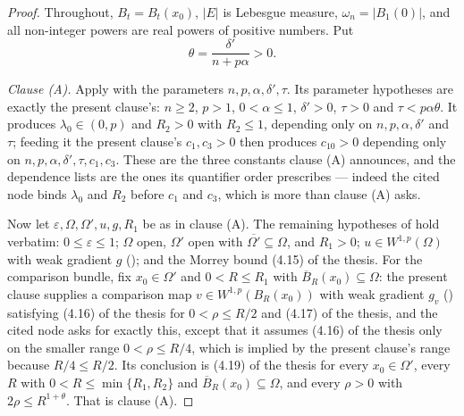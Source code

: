 \begin{proof}
Throughout, $B_t=B_t(x_0)$, $|E|$ is Lebesgue measure, $\omega_n=|B_1(0)|$, and
all non-integer powers are real powers of positive numbers.  Put
\[
\theta=\frac{\delta'}{n+p\alpha}>0 .
\]

\emph{Clause (A).}  Apply  with the parameters
$n,p,\alpha,\delta',\tau$.  Its parameter hypotheses are exactly the present
clause's: $n\ge2$, $p>1$, $0<\alpha\le1$, $\delta'>0$, $\tau>0$ and
$\tau<p\alpha\theta$.  It produces $\lambda_0\in(0,p)$ and $R_2>0$ with
$R_2\le1$, depending only on $n,p,\alpha,\delta'$ and $\tau$; feeding it the
present clause's $c_1,c_3>0$ then produces $c_{10}>0$ depending only on
$n,p,\alpha,\delta',\tau,c_1,c_3$.  These are the three constants clause (A)
announces, and the dependence lists are the ones its quantifier order
prescribes --- indeed the cited node binds $\lambda_0$ and $R_2$ before $c_1$
and $c_3$, which is more than clause (A) asks.

Now let $\varepsilon,\Omega,\Omega',u,g,R_1$ be as in clause (A).  The remaining
hypotheses of  hold verbatim:
$0\le\varepsilon\le1$; $\Omega$ open, $\Omega'$ open with
$\overline{\Omega'}\subseteq\Omega$, and $R_1>0$; $u\in W^{1,p}(\Omega)$ with
weak gradient $g$ (); and the Morrey bound
(4.15) of the thesis.  For the comparison bundle, fix $x_0\in\Omega'$ and
$0<R\le R_1$ with $\overline B_R(x_0)\subseteq\Omega$: the present clause
supplies a comparison map $v\in W^{1,p}(B_R(x_0))$ with weak gradient $g_v$
() satisfying (4.16) of the thesis for $0<\rho\le R/2$ and
(4.17) of the thesis, and the cited node asks for exactly this, except that it
assumes (4.16) of the thesis only on the smaller range $0<\rho\le R/4$, which is
implied by the present clause's range because $R/4\le R/2$.  Its conclusion is
(4.19) of the thesis for every $x_0\in\Omega'$, every $R$ with
$0<R\le\min\{R_1,R_2\}$ and $\overline B_R(x_0)\subseteq\Omega$, and every
$\rho>0$ with $2\rho\le R^{1+\theta}$.  That is clause (A).



\end{proof}
